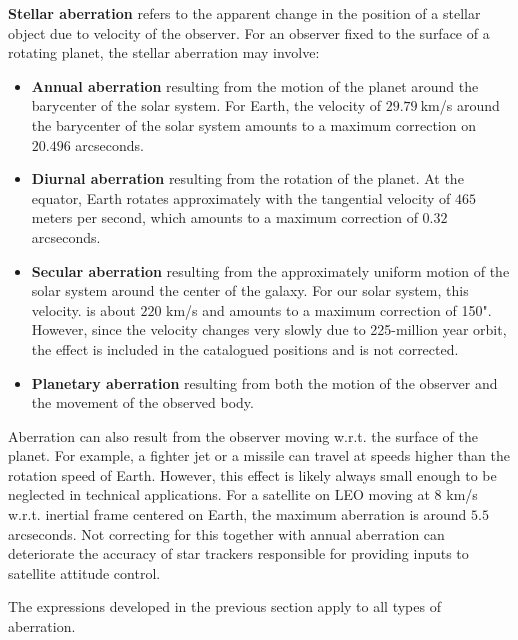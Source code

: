 \documentclass [12pt, a4paper] {article}
\begin{document}
\textbf{Stellar aberration} refers to the apparent change in the position 
of a stellar object due to velocity of the observer. For an observer fixed 
to the surface of a rotating planet, the stellar aberration may involve:
\begin {itemize}
    \item \textbf{Annual aberration} resulting from the motion of the planet 
    around the barycenter of the solar system. For Earth, the velocity of 
    $29.79\:$km/s around the barycenter of the solar system amounts to a 
    maximum correction on $20.496$ arcseconds.
    \item \textbf{Diurnal aberration} resulting from the rotation of the 
    planet. At the equator, Earth rotates approximately with the tangential
    velocity of $465$ meters per second, which amounts to a maximum 
    correction of $0.32$ arcseconds.
    \item \textbf{Secular aberration} resulting from the approximately uniform 
    motion of the solar system around the center of the galaxy. For our 
    solar system, this velocity. is about $220$ km/s and amounts to a 
    maximum correction of 150". However, since the velocity changes very slowly
    due to 225-million year orbit, the effect is included in the catalogued 
    positions and is not corrected.
    \item \textbf{Planetary aberration} resulting from both the motion 
    of the observer and the movement of the observed body. 
\end {itemize}
Aberration can also result from the observer moving w.r.t. 
the surface of the planet. For example, a fighter jet or a missile 
can travel at speeds higher than the rotation speed of Earth. However, 
this effect is likely always small enough to be neglected in technical 
applications.
For a satellite on LEO moving at $8$ km/s w.r.t. inertial frame centered 
on Earth, the maximum aberration is around $5.5$ arcseconds. Not correcting 
for this together with annual aberration can deteriorate the accuracy of 
star trackers responsible for providing inputs to satellite attitude control.

The expressions developed in the previous section apply to all types of 
aberration. 
\end{document}
